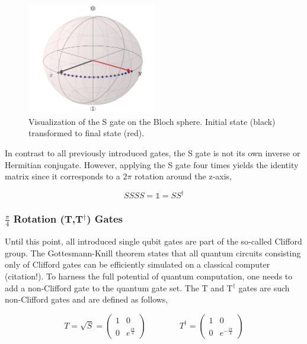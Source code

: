 \begin{figure}[ht]
   \centering
   \includegraphics[width=0.5\textwidth]{img/blochsgate.png}
   \caption{Visualization of the S gate on the Bloch sphere. Initial state (black) transformed to final state (red).}
   \label{img:blochsgate}
\end{figure}

In contrast to all previously introduced gates, the S gate is not its own inverse or Hermitian conjugate. However, applying the S gate four times yields the identity matrix since it corresponds to a $2\pi$ rotation around the z-axis,

\begin{equation}
SSSS = \mathbb{1} = SS^\dagger
\end{equation}

\subsubsection{$\frac{\pi}{4}$ Rotation (T,T$^\dagger$) Gates}
\label{subsubsubsec:noncliffordgates}

Until this point, all introduced single qubit gates are part of the so-called Clifford group. The Gottesmann-Knill theorem states that all quantum circuits consisting only of Clifford gates can be efficiently simulated on a classical computer (citation!). To harness the full potential of quantum computation, one needs to add a non-Clifford gate to the quantum gate set. The T and T$^\dagger$ gates are such non-Clifford gates and are defined as follows,

\begin{equation}
T = \sqrt{S} = \begin{pmatrix}
 1 & 0 \\ 
 0 & e^{\frac{i\pi}{4}}
 \end{pmatrix}
\quad \quad \quad \quad
T^\dagger = \begin{pmatrix}
 1 & 0 \\ 
 0 & e^{-\frac{i\pi}{4}}
 \end{pmatrix}
\end{equation}

